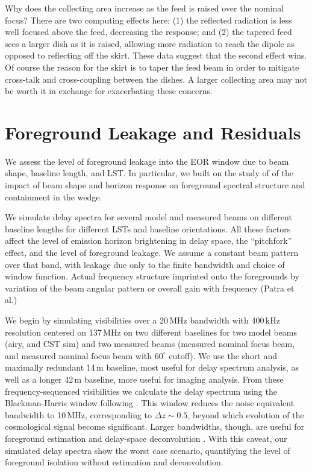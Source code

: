 \documentclass{emulateapj}
\begin{document}
Why does the collecting area increase as the feed is raised over the nominal focus? There are two computing effects here: (1) the reflected radiation is less well focused above the feed, decreasing the response; and (2) the tapered feed sees a larger dish as it is raised, allowing more radiation to reach the dipole as opposed to reflecting off the skirt. These data suggest that the second effect wins. Of course the reason for the skirt is to taper the feed beam in order to mitigate cross-talk and cross-coupling between the dishes. A larger collecting area may not be worth it in exchange for exacerbating these concerns.

\section{Foreground Leakage and Residuals}
\label{sec:foregroundleakage}

We assess the level of foreground leakage into the EOR window due to beam shape, baseline length, and LST. In particular, we built on the study of \citet{nithya15} of the impact of beam shape and horizon response on foreground spectral structure and containment in the wedge.

We simulate delay spectra for several model and measured beams on different baseline lengths for different LSTs and baseline orientations. All these factors affect the level of emission horizon brightening in delay space, the ``pitchfork'' effect, and the level of foreground leakage. We assume a constant beam pattern over that band, with leakage due only to the finite bandwidth and choice of window function. Actual frequency structure imprinted onto the foregrounds by variation of the beam angular pattern or overall gain with frequency (Patra et al.)

We begin by simulating visibilities over a 20\,MHz bandwidth with  400\,kHz resolution centered on 137\,MHz on two different baselines for two model beams (airy, and CST sim) and two measured beams (measured nominal focus beam, and measured nominal focus beam with $60^\circ$ cutoff). We use the short and maximally redundant 14\,m baseline, most useful for delay spectrum analysis, as well as a longer 42\,m baseline, more useful for imaging analysis. From these frequency-sequenced visibilities we calculate the delay spectrum  \citep{perbaselinetechnique} using the Blackman-Harris window following \citet{nithya15}. This window reduces the noise equivalent bandwidth to 10\,MHz, corresponding to $\Delta z\sim0.5$, beyond which evolution of the cosmological signal become significant. Larger bandwidths, though, are useful for foreground estimation and delay-space deconvolution \citep{parsonsandbacker,paper32,paper64}. With this caveat, our simulated delay spectra show the worst case scenario, quantifying the level of foreground isolation without estimation and deconvolution.
\end{document}
